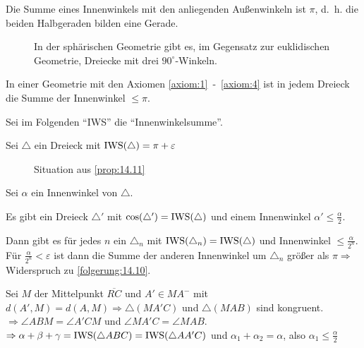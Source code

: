 \begin{beweis}
    Die Summe eines Innenwinkels mit den anliegenden Außenwinkeln ist
    $\pi$, d.~h. die beiden Halbgeraden bilden eine Gerade.
\end{beweis}

\begin{figure}[htp]
    \centering
    
    \caption{In der sphärischen Geometrie gibt es, im Gegensatz zur euklidischen Geometrie, Dreiecke mit drei $90^\circ$-Winkeln.}
    \label{fig:bem.14.9}
\end{figure}

\begin{proposition}\label{prop:14.11}%
    In einer Geometrie mit den Axiomen \ref{axiom:1}~-~\ref{axiom:4}
    ist in jedem Dreieck die Summe der Innenwinkel $\leq \pi$.
\end{proposition}

Sei im Folgenden \enquote{IWS} die \enquote{Innenwinkelsumme}.

\begin{beweis}
    Sei $\triangle$ ein Dreieck mit $\operatorname{IWS}(\triangle) = \pi + \varepsilon$

    \begin{figure}[ht]
        \centering
        \label{fig:prop14.11.0}
        \caption{Situation aus \cref{prop:14.11}}
    \end{figure}

    Sei $\alpha$ ein Innenwinkel von $\triangle$.

    \begin{behauptung}
        Es gibt ein Dreieck $\triangle'$ mit 
        $\cos(\triangle') = \operatorname{IWS}(\triangle)$ und einem Innenwinkel
        $\alpha' \leq \frac{\alpha}{2}$.

        Dann gibt es für jedes $n$ ein $\triangle_n$ mit $\operatorname{IWS}(\triangle_n) = \operatorname{IWS}(\triangle)$
        und Innenwinkel $\leq \frac{\alpha}{2^n}$. Für $\frac{\alpha}{2^n} < \varepsilon$
        ist dann die Summe der  anderen Innenwinkel
        um $\triangle_n$ größer als $\pi \Rightarrow$ Widerspruch zu
        \cref{folgerung:14.10}.
    \end{behauptung}

    \begin{beweis}
        Sei $M$ der Mittelpunkt $\overline{RC}$ und $A' \in MA^-$ mit
        $d(A', M) = d(A, M) \Rightarrow \triangle(MA'C)$ und
        $\triangle(MAB)$ sind kongruent.
        $\Rightarrow \angle ABM = \angle A'CM$ und $\angle MA'C = \angle MAB$.
        $\Rightarrow \alpha + \beta + \gamma =\operatorname{IWS}(\triangle ABC) = \operatorname{IWS}(\triangle AA'C)$
        und $\alpha_1 + \alpha_2 = \alpha$, also \obda $\alpha_1 \leq \frac{\alpha}{2}$
    \end{beweis}
\end{beweis}
